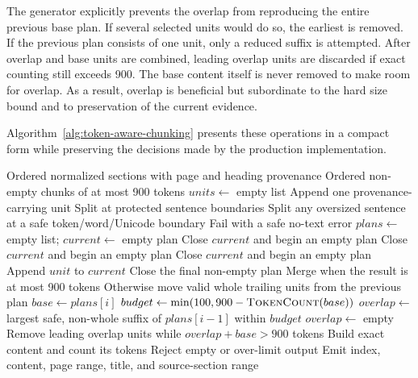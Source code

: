 The generator explicitly prevents the overlap from reproducing the entire
previous base plan. If several selected units would do so, the earliest is
removed. If the previous plan consists of one unit, only a reduced suffix is
attempted. After overlap and base units are combined, leading overlap units are
discarded if exact counting still exceeds 900. The base content itself is never
removed to make room for overlap. As a result, overlap is beneficial but
subordinate to the hard size bound and to preservation of the current evidence.

Algorithm~\ref{alg:token-aware-chunking} presents these operations in a compact
form while preserving the decisions made by the production implementation.

\begin{algorithm}[!htbp]
	\caption{Token-aware document chunking with bounded overlap}
	\label{alg:token-aware-chunking}
	\begin{algorithmic}[1]
		\Require Ordered normalized sections with page and heading provenance
		\Ensure Ordered non-empty chunks of at most 900 tokens
		\State $units \gets$ empty list
					\State Append one provenance-carrying unit
				\Else
					\State Split at protected sentence boundaries
					\State Split any oversized sentence at a safe token/word/Unicode boundary
				\EndIf
			\EndFor
		\EndFor
			\State Fail with a safe no-text error
		\EndIf
		\State $plans \gets$ empty list; $current \gets$ empty plan
				\State Close $current$ and begin an empty plan
			\EndIf
				\State Close $current$ and begin an empty plan
			\EndIf
				\State Close $current$ and begin an empty plan
			\EndIf
			\State Append $unit$ to $current$
		\EndFor
		\State Close the final non-empty plan
			\State Merge when the result is at most 900 tokens
			\State Otherwise move valid whole trailing units from the previous plan
		\EndIf
			\State $base \gets plans[i]$
				\State $budget \gets \min(100, 900 - \Call{TokenCount}{base})$
				\State $overlap \gets$ largest safe, non-whole suffix of $plans[i-1]$ within $budget$
			\Else
				\State $overlap \gets$ empty
			\EndIf
			\State Remove leading overlap units while $overlap + base > 900$ tokens
			\State Build exact content and count its tokens
			\State Reject empty or over-limit output
			\State Emit index, content, page range, title, and source-section range
		\EndFor
	\end{algorithmic}
\end{algorithm}

